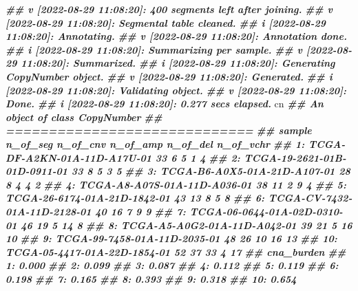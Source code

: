 \documentclass[
  12pt,
  a4paper,
  twoside]{book}
\newenvironment{Shaded}{\begin{snugshade}}{\end{snugshade}}
\newcommand{\DocumentationTok}[1]{\textcolor[rgb]{0.56,0.35,0.01}{\textbf{\textit{#1}}}}
\newcommand{\NormalTok}[1]{#1}
\begin{document}
\begin{Shaded}
\begin{Highlighting}[]
\DocumentationTok{\#\# v [2022{-}08{-}29 11:08:20]: 400 segments left after joining.}
\DocumentationTok{\#\# v [2022{-}08{-}29 11:08:20]: Segmental table cleaned.}
\DocumentationTok{\#\# i [2022{-}08{-}29 11:08:20]: Annotating.}
\DocumentationTok{\#\# v [2022{-}08{-}29 11:08:20]: Annotation done.}
\DocumentationTok{\#\# i [2022{-}08{-}29 11:08:20]: Summarizing per sample.}
\DocumentationTok{\#\# v [2022{-}08{-}29 11:08:20]: Summarized.}
\DocumentationTok{\#\# i [2022{-}08{-}29 11:08:20]: Generating CopyNumber object.}
\DocumentationTok{\#\# v [2022{-}08{-}29 11:08:20]: Generated.}
\DocumentationTok{\#\# i [2022{-}08{-}29 11:08:20]: Validating object.}
\DocumentationTok{\#\# v [2022{-}08{-}29 11:08:20]: Done.}
\DocumentationTok{\#\# i [2022{-}08{-}29 11:08:20]: 0.277 secs elapsed.}
\NormalTok{cn}
\DocumentationTok{\#\# An object of class CopyNumber }
\DocumentationTok{\#\# =============================}
\DocumentationTok{\#\#                           sample n\_of\_seg n\_of\_cnv n\_of\_amp n\_of\_del n\_of\_vchr}
\DocumentationTok{\#\#  1: TCGA{-}DF{-}A2KN{-}01A{-}11D{-}A17U{-}01       33        6        5        1         4}
\DocumentationTok{\#\#  2: TCGA{-}19{-}2621{-}01B{-}01D{-}0911{-}01       33        8        5        3         5}
\DocumentationTok{\#\#  3: TCGA{-}B6{-}A0X5{-}01A{-}21D{-}A107{-}01       28        8        4        4         2}
\DocumentationTok{\#\#  4: TCGA{-}A8{-}A07S{-}01A{-}11D{-}A036{-}01       38       11        2        9         4}
\DocumentationTok{\#\#  5: TCGA{-}26{-}6174{-}01A{-}21D{-}1842{-}01       43       13        8        5         8}
\DocumentationTok{\#\#  6: TCGA{-}CV{-}7432{-}01A{-}11D{-}2128{-}01       40       16        7        9         9}
\DocumentationTok{\#\#  7: TCGA{-}06{-}0644{-}01A{-}02D{-}0310{-}01       46       19        5       14         8}
\DocumentationTok{\#\#  8: TCGA{-}A5{-}A0G2{-}01A{-}11D{-}A042{-}01       39       21        5       16        10}
\DocumentationTok{\#\#  9: TCGA{-}99{-}7458{-}01A{-}11D{-}2035{-}01       48       26       10       16        13}
\DocumentationTok{\#\# 10: TCGA{-}05{-}4417{-}01A{-}22D{-}1854{-}01       52       37       33        4        17}
\DocumentationTok{\#\#     cna\_burden}
\DocumentationTok{\#\#  1:      0.000}
\DocumentationTok{\#\#  2:      0.099}
\DocumentationTok{\#\#  3:      0.087}
\DocumentationTok{\#\#  4:      0.112}
\DocumentationTok{\#\#  5:      0.119}
\DocumentationTok{\#\#  6:      0.198}
\DocumentationTok{\#\#  7:      0.165}
\DocumentationTok{\#\#  8:      0.393}
\DocumentationTok{\#\#  9:      0.318}
\DocumentationTok{\#\# 10:      0.654}
\end{Highlighting}
\end{Shaded}
\end{document}
